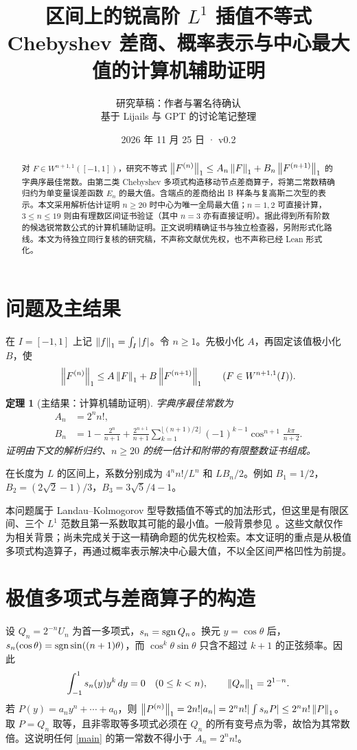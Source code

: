 \documentclass[11pt,a4paper,fontset=fandol]{ctexart}
\title{区间上的锐高阶 $L^1$ 插值不等式\\[4pt]\large Chebyshev 差商、概率表示与中心最大值的计算机辅助证明}
\author{研究草稿：作者与署名待确认\\\small 基于 Lijails 与 GPT 的讨论笔记整理}
\date{2026 年 11 月 25 日 · v0.2}
\newtheorem{theorem}{定理}\newtheorem{lemma}{引理}\newtheorem{proposition}{命题}
\begin{document}
\maketitle
\begin{abstract}
对 $F\in W^{n+1,1}([-1,1])$，研究不等式 $\left\|F^{(n)}\right\|_1\le A_n\left\|F\right\|_1+B_n\left\|F^{(n+1)}\right\|_1$ 的字典序最佳常数。由第二类 Chebyshev 多项式构造移动节点差商算子，将第二常数精确归约为单变量误差函数 $E_n$ 的最大值。含端点的差商给出 B 样条与复高斯二次型的表示。本文采用解析估计证明 $n\ge20$ 时中心为唯一全局最大值；$n=1,2$ 可直接计算，$3\le n\le19$ 则由有理数区间证书验证（其中 $n=3$ 亦有直接证明）。据此得到所有阶数的候选锐常数公式的计算机辅助证明。正文说明精确证书与独立检查器，另附形式化路线。本文为待独立同行复核的研究稿，不声称文献优先权，也不声称已经 Lean 形式化。
\end{abstract}
\section{问题及主结果}
在 $I=[-1,1]$ 上记 $\left\|f\right\|_1=\int_I|f|$。令 $n\ge1$。先极小化 $A$，再固定该值极小化 $B$，使
\begin{equation}\label{main}
\left\|F^{(n)}\right\|_1\le A\left\|F\right\|_1+B\left\|F^{(n+1)}\right\|_1\qquad(F\in W^{n+1,1}(I)).
\end{equation}
\begin{theorem}[主结果：计算机辅助证明]\label{thm:main}
字典序最佳常数为
\begin{align*}
A_n&=2^nn!,\\
B_n&=1-\frac{2^n}{n+1}+\frac{2^{n+1}}{n+1}
\sum_{k=1}^{\lfloor(n+1)/2\rfloor}(-1)^{k-1}\cos^{n+1}\frac{k\pi}{n+2}.
\end{align*}
证明由下文的解析归约、$n\ge20$ 的统一估计和附带的有限整数证书组成。
\end{theorem}
在长度为 $L$ 的区间上，系数分别成为 $4^nn!/L^n$ 和 $LB_n/2$。例如 $B_1=1/2$，$B_2=(2\sqrt2-1)/3$，$B_3=3\sqrt5/4-1$。

本问题属于 Landau--Kolmogorov 型导数插值不等式的加法形式，但这里是有限区间、三个 $L^1$ 范数且第一系数取其可能的最小值。一般背景参见 \cite{LK,Finch,MPF}。这些文献仅作为相关背景；尚未完成关于这一精确命题的优先权检索。本文证明的重点是从极值多项式构造算子，再通过概率表示解决中心最大值，不以全区间严格凹性为前提。
\section{极值多项式与差商算子的构造}
设 $Q_n=2^{-n}U_n$ 为首一多项式，$s_n=\operatorname{sgn} Q_n$。换元 $y=\cos\theta$ 后，$s_n(\cos\theta)=\operatorname{sgn}\sin((n+1)\theta)$，而 $\cos^k\theta\sin\theta$ 只含不超过 $k+1$ 的正弦频率。因此
\begin{equation}\label{mom}
 \int_{-1}^1s_n(y)y^k\,dy=0\quad(0\le k<n),\qquad \left\|Q_n\right\|_1=2^{1-n}.
\end{equation}
若 $P(y)=a_ny^n+\cdots+a_0$，则 $\left\|P^{(n)}\right\|_1=2n!|a_n|=2^nn!|\int s_nP|\le 2^nn!\left\|P\right\|_1$。取 $P=Q_n$ 取等，且非零取等多项式必须在 $Q_n$ 的所有变号点为零，故恰为其常数倍。这说明任何 \eqref{main} 的第一常数不得小于 $A_n=2^nn!$。
\end{document}
